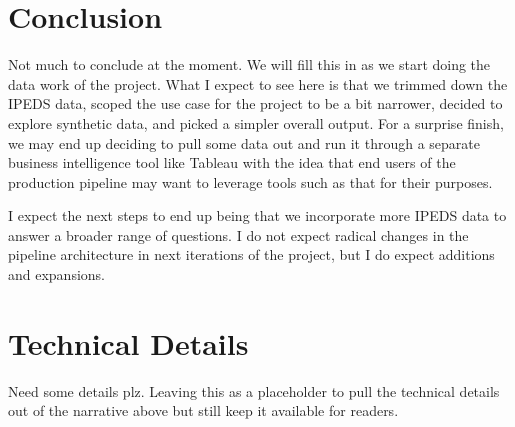 \documentclass[sigconf, authorversion, nonacm]{acmart}
\begin{document}
\section{Conclusion}
    Not much to conclude at the moment. We will fill this in as we start doing the data work of the project. What I expect to see here is that we trimmed down the IPEDS data, scoped the use case for the project to be a bit narrower, decided to explore synthetic data, and picked a simpler overall output. For a surprise finish, we may end up deciding to pull some data out and run it through a separate business intelligence tool like Tableau with the idea that end users of the production pipeline may want to leverage tools such as that for their purposes.

    I expect the next steps to end up being that we incorporate more IPEDS data to answer a broader range of questions. I do not expect radical changes in the pipeline architecture in next iterations of the project, but I do expect additions and expansions.




\appendix

\section{Technical Details}
    Need some details plz. Leaving this as a placeholder to pull the technical details out of the narrative above but still keep it available for readers.
\end{document}
